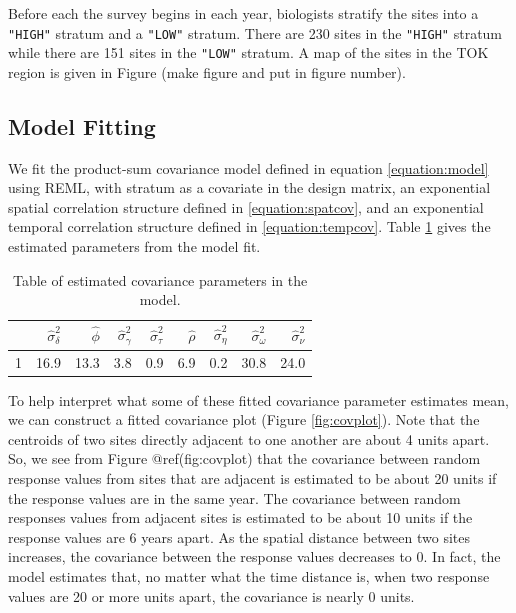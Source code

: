 \documentclass[]{interact}
\theoremstyle{plain}%
\theoremstyle{definition}
\theoremstyle{remark}
\begin{document}
Before each the survey begins in each year, biologists stratify the
sites into a \texttt{"HIGH"} stratum and a \texttt{"LOW"} stratum. There
are 230 sites in the \texttt{"HIGH"} stratum while there are 151 sites
in the \texttt{"LOW"} stratum. A map of the sites in the TOK region is
given in Figure (make figure and put in figure number).

\subsection{Model Fitting} \label{subsection:modelfit}

We fit the product-sum covariance model defined in equation
\ref{equation:model} using REML, with stratum as a covariate in the
design matrix, an exponential spatial correlation structure defined in
\ref{equation:spatcov}, and an exponential temporal correlation
structure defined in \ref{equation:tempcov}. Table \ref{paramest} gives
the estimated parameters from the model fit.

\begin{table}[ht]
\centering
\begin{tabular}{rrrrrrrrr}
  \hline
 & $\hat{\sigma}^2_{\delta}$ & $\hat{\phi}$ & $\hat{\sigma}^2_{\gamma}$ & $\hat{\sigma}^2_{\tau}$ & $\hat{\rho}$ & $\hat{\sigma}^2_{\eta}$ & $\hat{\sigma}^2_{\omega}$ & $\hat{\sigma}^2_{\nu}$ \\ 
  \hline
1 & 16.9 & 13.3 & 3.8 & 0.9 & 6.9 & 0.2 & 30.8 & 24.0 \\ 
   \hline
\end{tabular}
\caption{Table of estimated covariance parameters in the model.} 
\label{paramest}
\end{table}

To help interpret what some of these fitted covariance parameter
estimates mean, we can construct a fitted covariance plot (Figure
\ref{fig:covplot}). Note that the centroids of two sites directly
adjacent to one another are about 4 units apart. So, we see from Figure
@ref(fig:covplot) that the covariance between random response values
from sites that are adjacent is estimated to be about 20 units if the
response values are in the same year. The covariance between random
responses values from adjacent sites is estimated to be about 10 units
if the response values are 6 years apart. As the spatial distance
between two sites increases, the covariance between the response values
decreases to 0. In fact, the model estimates that, no matter what the
time distance is, when two response values are 20 or more units apart,
the covariance is nearly 0 units.
\end{document}

